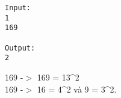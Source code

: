 \begin{verbatim}
Input:
1
169

Output:
2
\end{verbatim}

169 -$>$ 169 = 13^2
\\169 -$>$ 16 = 4^2 và 9 = 3^2.